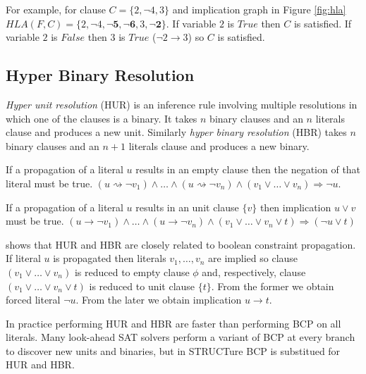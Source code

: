 For example, for clause $C = \{ 2, \neg 4, 3\}$ and implication graph
in Figure \ref{fig:hla} $HLA(F, C) = \{2, \neg 4, \mathbf{\neg 5,
\neg 6}, 3, \mathbf{\neg 2} \}$.  If variable $2$ is $True$ then
$C$ is satisfied. If variable $2$ is $False$ then $3$ is $True$
($\neg 2 \rightarrow 3$) so $C$ is satisfied.


\subsection{Hyper Binary Resolution}
\label{ssec:hbr}

\emph{Hyper unit resolution} (HUR) \cite{Kusper02solvingthe} is
an inference rule involving multiple resolutions in which one of
the clauses is a binary. It takes $n$ binary clauses and an $n$
literals clause and produces a new unit.  Similarly \emph{hyper
binary resolution} (HBR) \cite{Bacchus03effectivepreprocessing} takes
$n$ binary clauses and an $n + 1$ literals clause and produces a
new binary.

\begin{myprop}
  If a propagation of a literal $u$ results in an empty clause then
  the negation of that literal must be true.
  $(u \rightsquigarrow \neg v_1) \land \ldots
  \land (u \rightsquigarrow \neg v_n) \land (v_1 \lor \dots \lor v_n)
  \Rightarrow \neg u$. 
\end{myprop}

\begin{myprop}
  If a propagation of a literal $u$ results in an unit clause $\{ v \}$
  then implication $u \lor v$ must be true.
  $(u \rightarrow \neg v_1) \land \ldots
  \land (u \rightarrow \neg v_n)
  \land (v_1 \lor \dots \lor v_n \lor t) \Rightarrow (\neg u \lor t)$
\end{myprop}

\cite{Bacchus03effectivepreprocessing} shows that HUR and HBR are
closely related to boolean constraint propagation.  If literal $u$
is propagated then literals $v_1, \ldots, v_n$ are implied so clause
$(v_1 \lor \dots \lor v_n)$ is reduced to empty clause $\phi$ and,
respectively, clause $(v_1 \lor \dots \lor v_n \lor t)$ is reduced
to unit clause $\{ t \}$. From the former we obtain forced literal
$\neg u$. From the later we obtain implication $u \rightarrow t$.

In practice performing HUR and HBR are faster than performing BCP on
all literals. Many look-ahead SAT solvers perform a variant of BCP
\cite{Freeman:1995:IPS:220639} at every branch to discover new units
and binaries, but in STRUCTure BCP is substitued for HUR and HBR.

